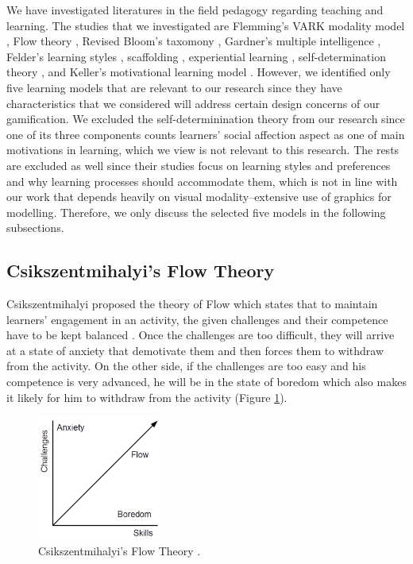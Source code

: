 \documentclass[12pt, a4paper]{report}
\begin{document}
We have investigated literatures in the field pedagogy regarding teaching and learning. The studies that we investigated are Flemming's VARK modality model \cite{fleming2006learning}, Flow theory \cite{csikszentmihalyi2014toward}, Revised Bloom's taxomony \cite{krathwohl2002revision}, Gardner's multiple intelligence \cite{gardner2011frames}, Felder's learning styles \cite{felder1988learning},  scaffolding \cite{wood1976role, vygotsky1978mind}, experiential learning \cite{kolb2014experiential}, self-determination theory \cite{ryan2000self}, and Keller's motivational learning model \cite{keller2010motivational}. However, we identified only five learning models that are relevant to our research since they have characteristics that we considered will address certain design concerns of our gamification. We excluded the self-determinination theory from our research since one of its three components counts learners' social affection aspect as one of main motivations in learning, which we view is not relevant to this research. The rests are excluded as well since their studies focus on learning styles and preferences and why learning processes should accommodate them, which is not in line with our work that depends heavily on visual modality--extensive use of graphics for modelling. Therefore, we only discuss the selected five models in the following subsections.

\subsection{Csikszentmihalyi's Flow Theory}
Csikszentmihalyi proposed the theory of Flow which states that to maintain learners' engagement in an activity, the given challenges and their competence have to be kept balanced \cite{csikszentmihalyi2014toward}. Once the challenges are too difficult, they will arrive at a state of anxiety that demotivate them and then forces them to withdraw from the activity. On the other side, if the challenges are too easy and his competence is very advanced, he will be in the state of boredom which also makes it likely for him to withdraw from the activity (Figure \ref{flow-theory}).

\begin{figure}[ht]
\centering
\includegraphics[width=4cm]{flow-theory}
\caption{Csikszentmihalyi's Flow Theory \cite{csikszentmihalyi2014toward}.}
\label{flow-theory}
\end{figure}
 
\end{document}
